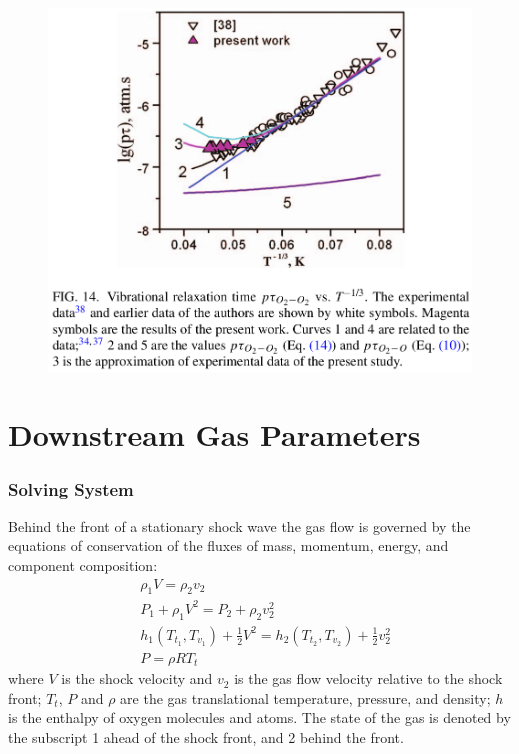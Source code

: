 \documentclass[10pt]{beamer}
\begin{document}
\begin{frame}
\begin{figure}[ht]
\centering
\includegraphics[width=\textwidth]{figures/relaxTime.png}
\end{figure}
\end{frame}


\section{Downstream Gas Parameters}

\begin{frame}
\frametitle{Solving System}
Behind the front of a stationary shock wave the gas flow is governed by the
equations of conservation of the fluxes of mass, momentum, energy, and component
composition:
\begin{align*}
& \rho_1V=\rho_2v_2 \\
& P_1+\rho_1V^2=P_2+\rho_2v_2^2 \\
& h_1(T_{t_1},T_{v_1})+\frac{1}{2}V^2=h_2(T_{t_2},T_{v_2})
+\frac{1}{2}v_2^2 \\
& P=\rho RT_t
\end{align*}
where $V$ is the shock velocity and $v_2$ is the gas flow velocity relative to
the shock front; $T_t$, $P$ and $\rho$ are the gas translational temperature,
pressure, and density; $h$ is the enthalpy of oxygen molecules and atoms. The
state of the gas is denoted by the subscript 1 ahead of the shock front, and 2
behind the front.
\end{frame}
\end{document}
